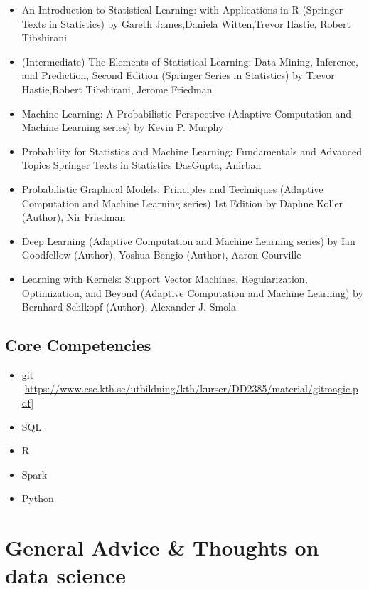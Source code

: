 \documentclass[
  11pt,
]{book}
\providecommand{\tightlist}{%
  \setlength{\itemsep}{0pt}\setlength{\parskip}{0pt}}
\begin{document}
\begin{itemize}
\tightlist
\item
  An Introduction to Statistical Learning: with Applications in R (Springer Texts in Statistics) by Gareth James,Daniela Witten,Trevor Hastie, Robert Tibshirani
\item
  (Intermediate) The Elements of Statistical Learning: Data Mining, Inference, and Prediction, Second Edition (Springer Series in Statistics) by Trevor Hastie,Robert Tibshirani, Jerome Friedman
\item
  Machine Learning: A Probabilistic Perspective (Adaptive Computation and Machine Learning series) by Kevin P. Murphy
\item
  Probability for Statistics and Machine Learning: Fundamentals and Advanced Topics Springer Texts in Statistics DasGupta, Anirban
\item
  Probabilistic Graphical Models: Principles and Techniques (Adaptive Computation and Machine Learning series) 1st Edition by Daphne Koller (Author), Nir Friedman
\item
  Deep Learning (Adaptive Computation and Machine Learning series) by Ian Goodfellow (Author), Yoshua Bengio (Author), Aaron Courville
\item
  Learning with Kernels: Support Vector Machines, Regularization, Optimization, and Beyond (Adaptive Computation and Machine Learning) by Bernhard Schlkopf (Author), Alexander J. Smola
\end{itemize}

\hypertarget{core-competencies}{%
\section{Core Competencies}\label{core-competencies}}

\begin{itemize}
\tightlist
\item
  git {[}\url{https://www.csc.kth.se/utbildning/kth/kurser/DD2385/material/gitmagic.pdf}{]}
\item
  SQL
\item
  R
\item
  Spark
\item
  Python
\end{itemize}

\hypertarget{general-advice-thoughts-on-data-science}{%
\chapter{General Advice \& Thoughts on data science}\label{general-advice-thoughts-on-data-science}}
\end{document}
